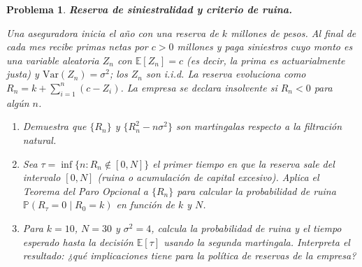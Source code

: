 \documentclass[12pt]{article}
\newtheorem{problem}{Problema}
\begin{document}
\begin{problem}
\textbf{Reserva de siniestralidad y criterio de ruina.}

Una aseguradora inicia el año con una reserva de $k$ millones de pesos. Al final de cada mes recibe primas netas por $c > 0$ millones y paga siniestros cuyo monto es una variable aleatoria $Z_n$ con $\mathbb{E}[Z_n] = c$ (es decir, la prima es actuarialmente justa) y $\mathrm{Var}(Z_n) = \sigma^2$; los $Z_n$ son i.i.d. La reserva evoluciona como $R_n = k + \sum_{i=1}^n (c - Z_i)$. La empresa se declara insolvente si $R_n < 0$ para algún $n$.

\begin{enumerate}
    \item[(a)] Demuestra que $\{R_n\}$ y $\{R_n^2 - n\sigma^2\}$ son martingalas respecto a la filtración natural.

    \item[(b)] Sea $\tau = \inf\{n : R_n \notin [0, N]\}$ el primer tiempo en que la reserva sale del intervalo $[0, N]$ (ruina o acumulación de capital excesivo). Aplica el Teorema del Paro Opcional a $\{R_n\}$ para calcular la probabilidad de ruina $\mathbb{P}(R_\tau = 0 \mid R_0 = k)$ en función de $k$ y $N$.

    \item[(c)] Para $k = 10$, $N = 30$ y $\sigma^2 = 4$, calcula la probabilidad de ruina y el tiempo esperado hasta la decisión $\mathbb{E}[\tau]$ usando la segunda martingala. Interpreta el resultado: ¿qué implicaciones tiene para la política de reservas de la empresa?
\end{enumerate}
\end{problem}

%
%
%
%
\end{document}
